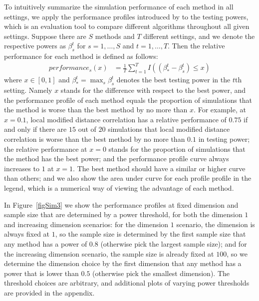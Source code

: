 \documentclass[12pt]{article}
\begin{document}
To intuitively summarize the simulation performance of each method in all settings, we apply the performance profiles introduced by \cite{DolanMore2002} to the testing powers, which is an evaluation tool to compare different algorithms throughout all given settings. Suppose there are $S$ methods and $T$ different settings, and we denote the respective powers as $\beta_{s}^{t}$ for $s=1,\ldots,S$ and $t=1,\ldots,T$. Then the relative performance for each method is defined as follows:
\begin{align*}
performance_{s}(x) &= \frac{1}{T} \sum_{t=1}^{T} I((\beta_{*}^{t}-\beta_{s}^{t}) \leq x)
\end{align*}
where $x \in [0,1]$ and $\beta_{*}^{t} =\max_{s} \beta_{s}^{t}$ denotes the best testing power in the $t$th setting. Namely $x$ stands for the difference with respect to the best power, and the performance profile of each method equals the proportion of simulations that the method is worse than the best method by no more than $x$. For example, at $x=0.1$, local modified distance correlation has a relative performance of $0.75$ if and only if there are $15$ out of $20$ simulations that local modified distance correlation is worse than the best method by no more than $0.1$ in testing power; the relative performance at $x=0$ stands for the proportion of simulations that the method has the best power; and the performance profile curve always increases to $1$ at $x=1$. The best method should have a similar or higher curve than others; and we also show the area under curve for each profile profile in the legend, which is a numerical way of viewing the advantage of each method.

In Figure~\ref{figSim3} we show the performance profiles at fixed dimension and sample size that are determined by a power threshold, for both the dimension $1$ and increasing dimension scenarios: for the dimension $1$ scenario, the dimension is always fixed at $1$, so the sample size is determined by the first sample size that any method has a power of $0.8$ (otherwise pick the largest sample size); and for the increasing dimension scenario, the sample size is already fixed at $100$, so we determine the dimension choice by the first dimension that any method has a power that is lower than $0.5$ (otherwise pick the smallest dimension). The threshold choices are arbitrary, and additional plots of varying power thresholds are provided in the appendix.
\end{document}
